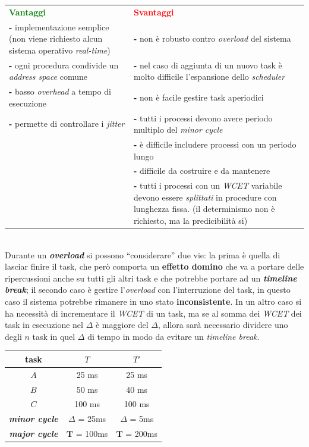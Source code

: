 \begin{tabular}{ p{7.25cm} | p{7.25cm} }
    \textcolor{green}{\textbf{Vantaggi}} & \textcolor{red}{\textbf{Svantaggi}} \\
    \textbf{-} implementazione semplice (non viene richiesto alcun sistema operativo \textit{real-time}) &  \textbf{-} non è robusto contro \textit{overload} del sistema \\
    \textbf{-} ogni procedura condivide un \textit{address space} comune & \textbf{-} nel caso di aggiunta di un nuovo task è molto difficile l'espansione dello \textit{scheduler} \\
    \textbf{-} basso \textit{overhead} a tempo di esecuzione & \textbf{-} non è facile gestire task aperiodici \\
    \textbf{-} permette di controllare i \textit{jitter} & \textbf{-} tutti i processi devono avere periodo multiplo del \textit{minor cycle} \\
     & \textbf{-} è difficile includere processi con un periodo lungo \\
     & \textbf{-} difficile da costruire e da mantenere \\
     & \textbf{-} tutti i processi con un \textit{WCET} variabile devono essere \textit{splittati} in procedure con lunghezza fissa. (il determinismo non è richiesto, ma la predicibilità si) \\
\end{tabular}
\\ \newline
Durante un \textbf{\textit{overload}} si possono ``considerare'' due vie: la prima è quella di lasciar finire il task, che però comporta un \textbf{effetto domino} che va a portare delle ripercussioni anche su tutti gli altri task e che potrebbe portare ad un \textbf{\textit{timeline break}}; il secondo caso è gestire l'\textit{overload} con l'interruzione del task, in questo caso il sistema potrebbe rimanere in uno stato \textbf{inconsistente}. In un altro caso si ha necessità di incrementare il \textit{WCET} di un task, ma se al somma dei \textit{WCET} dei task in esecuzione nel $\Delta$ è maggiore del $\Delta$, allora sarà necessario dividere uno degli $n$ task in quel $\Delta$ di tempo in modo da evitare un \textit{timeline break}.
\begin{center}
    \begin{tabular}{ | c | c | c | } \hline
        \textbf{task} & $T$ & $T'$ \\ \hline
        $A$ & 25 ms & 25 ms \\ \hline
        $B$ & 50 ms & 40 ms \\ \hline
        $C$ & 100 ms & 100 ms \\ \hline
        \textbf{\textit{minor cycle}} & $\Delta$ = 25ms & $\Delta$ = 5ms \\ \hline
        \textbf{\textit{major cycle}} & $\mathbf{T}$ = 100ms & $\mathbf{T}$ = 200ms \\ \hline
    \end{tabular}
\end{center}

